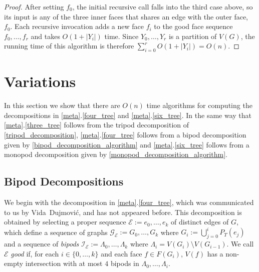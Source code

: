 \documentclass[a4paper,UKenglish,autoref]{lipics-v2021}
\begin{document}
\begin{proof}
After setting $f_0$, the initial recursive call falls into the third case above, so its input is any of the three inner faces that shares an edge with the outer face, $f_0$.  Each recursive invocation adds a new face $f_i$ to the good face sequence $f_0,\ldots,f_{r}$ and takes $O(1+|Y_i|)$ time.  Since $Y_0,\ldots,Y_{r}$ is a partition of $V(G)$, the running time of this algorithm is therefore $\sum_{i=0}^{r} O(1+|Y_i|) = O(n)$.
\end{proof}


\section{Variations}
\label{variants}

In this section we show that there are $O(n)$ time algorithms for computing the decompositions in \cref{meta}.\ref{four_tree} and \cref{meta}.\ref{six_tree}.  In the same way that \cref{meta}.\ref{three_tree} follows from the tripod decomposition of \cref{tripod_decomposition}, \cref{meta}.\ref{four_tree} follows from a bipod decomposition given by \cref{bipod_decomposition_algorithm} and \cref{meta}.\ref{six_tree} follows from a monopod decomposition given by \cref{monopod_decomposition_algorithm}.




%

\subsection{Bipod Decompositions}

We begin with the decomposition in \cref{meta}.\ref{four_tree}, which was communicated to us by Vida~Dujmović, and has not appeared before.  This decomposition is obtained by selecting a proper sequence $\mathcal{E}:=e_0,\ldots,e_k$ of distinct edges of $G$, which define a sequence of graphs $\mathcal{G_E}:=G_{0},\ldots,G_k$ where $G_i:=\bigcup_{j=0}^i P_T(e_j)$ and a sequence of \emph{bipods} $\mathcal{I_E}:=\Lambda_0,\ldots,\Lambda_k$ where $\Lambda_i=V(G_i)\setminus V(G_{i-1})$.  We call $\mathcal{E}$ \emph{good} if, for each $i\in\{0,\ldots,k\}$ and each face $f\in F(G_i)$, $V(f)$ has a non-empty intersection with at most $4$ bipods in $\Lambda_0,\ldots,\Lambda_i$.
\end{document}

